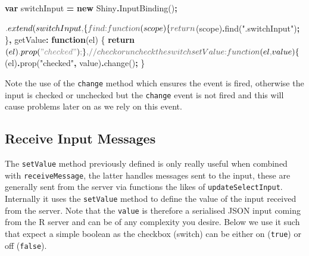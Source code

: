 \documentclass[
]{krantz}
\makeatletter
\newenvironment{Shaded}{\begin{snugshade}}{\end{snugshade}}
\newcommand{\CommentTok}[1]{\textcolor[rgb]{0.37,0.37,0.37}{\textit{#1}}}
\newcommand{\ControlFlowTok}[1]{\textcolor[rgb]{0.27,0.27,0.27}{\textbf{#1}}}
\newcommand{\DataTypeTok}[1]{\textcolor[rgb]{0.27,0.27,0.27}{#1}}
\newcommand{\FunctionTok}[1]{\textcolor[rgb]{0,0,0}{#1}}
\newcommand{\KeywordTok}[1]{\textcolor[rgb]{0.27,0.27,0.27}{\textbf{#1}}}
\newcommand{\NormalTok}[1]{#1}
\newcommand{\OperatorTok}[1]{\textcolor[rgb]{0.43,0.43,0.43}{\textbf{#1}}}
\newcommand{\StringTok}[1]{\textcolor[rgb]{0.5,0.5,0.5}{#1}}
\newenvironment{kframe}{%
\medskip{}
\setlength{\fboxsep}{.8em}
 \def\at@end@of@kframe{}%
 \ifinner\ifhmode%
  \def\at@end@of@kframe{\end{minipage}}%
  \begin{minipage}{\columnwidth}%
 \fi\fi%
 \def\FrameCommand##1{\hskip\@totalleftmargin \hskip-\fboxsep
 \colorbox{shadecolor}{##1}\hskip-\fboxsep
     \hskip-\linewidth \hskip-\@totalleftmargin \hskip\columnwidth}%
 \MakeFramed {\advance\hsize-\width
   \@totalleftmargin\z@ \linewidth\hsize
   \@setminipage}}%
 {\par\unskip\endMakeFramed%
 \at@end@of@kframe}
\renewenvironment{Shaded}{\begin{kframe}}{\end{kframe}}
\makeatother
\begin{document}
\begin{Shaded}
\begin{Highlighting}[]
\KeywordTok{var}\NormalTok{ switchInput }\OperatorTok{=} \KeywordTok{new}\NormalTok{ Shiny}\OperatorTok{.}\FunctionTok{InputBinding}\NormalTok{()}\OperatorTok{;}

\NormalTok{$}\OperatorTok{.}\FunctionTok{extend}\NormalTok{(switchInput}\OperatorTok{,}\NormalTok{ \{}
  \DataTypeTok{find}\OperatorTok{:} \KeywordTok{function}\NormalTok{(scope) \{}
    \ControlFlowTok{return}\NormalTok{ $(scope)}\OperatorTok{.}\FunctionTok{find}\NormalTok{(}\StringTok{".switchInput"}\NormalTok{)}\OperatorTok{;}
\NormalTok{  \}}\OperatorTok{,}
  \DataTypeTok{getValue}\OperatorTok{:} \KeywordTok{function}\NormalTok{(el) \{}
    \ControlFlowTok{return}\NormalTok{ $(el)}\OperatorTok{.}\FunctionTok{prop}\NormalTok{(}\StringTok{"checked"}\NormalTok{)}\OperatorTok{;}
\NormalTok{  \}}\OperatorTok{,}
  \CommentTok{// check or uncheck the switch}
  \DataTypeTok{setValue}\OperatorTok{:} \KeywordTok{function}\NormalTok{(el}\OperatorTok{,}\NormalTok{ value) \{}
\NormalTok{    $(el)}\OperatorTok{.}\FunctionTok{prop}\NormalTok{(}\StringTok{"checked"}\OperatorTok{,}\NormalTok{ value)}\OperatorTok{.}\FunctionTok{change}\NormalTok{()}\OperatorTok{;}
\NormalTok{  \}}
\end{Highlighting}
\end{Shaded}

Note the use of the \texttt{change} method which ensures the event is fired, otherwise the input is checked or unchecked but the \texttt{change} event is not fired and this will cause problems later on as we rely on this event.

\hypertarget{shiny-input-receive-msg}{%
\subsection{Receive Input Messages}\label{shiny-input-receive-msg}}

The \texttt{setValue} method previously defined is only really useful when combined with \texttt{receiveMessage}, the latter handles messages sent to the input, these are generally sent from the server via functions the likes of \texttt{updateSelectInput}. Internally it uses the \texttt{setValue} method to define the value of the input received from the server. Note that the \texttt{value} is therefore a serialised JSON input coming from the R server and can be of any complexity you desire. Below we use it such that expect a simple boolean as the checkbox (switch) can be either on (\texttt{true}) or off (\texttt{false}).
\end{document}
